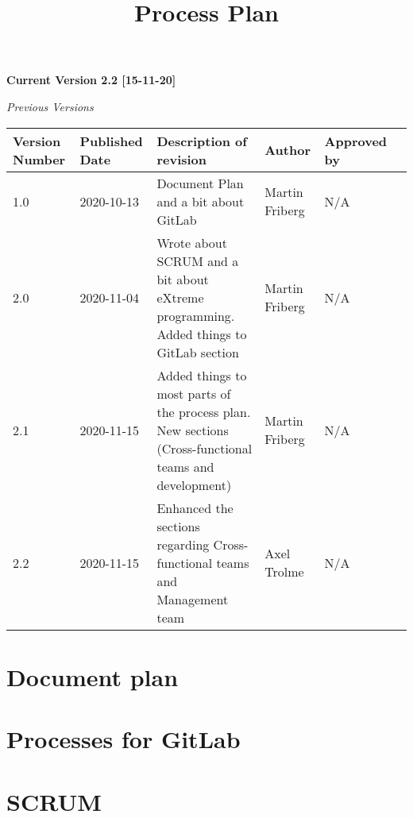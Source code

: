 \documentclass[12pt]{article}
\title{\Huge Process Plan}
\author{}
\begin{document}
\maketitle

\begin{center}
    \textbf{\large Current Version 2.2 [15-11-20]}
    \vspace{10mm}
    
    \emph{\large Previous Versions}
    
\begin{center}
\tiny
\begin{tabular}{ | m{5em} | m{5em}| m{10em} |m{5em}| m{5em} |m{5em} |  } 
\hline
Version Number& Published Date & Description of revision & Author & Approved by \\ 
\hline
1.0 & 2020-10-13 & Document Plan and a bit about GitLab & Martin Friberg & N/A \\
\hline
2.0 & 2020-11-04 & Wrote about SCRUM and a bit about eXtreme programming. Added things to GitLab section & Martin Friberg & N/A \\ 
\hline
2.1 & 2020-11-15 & Added things to most parts of the process plan. New sections (Cross-functional teams and development) & Martin Friberg & N/A \\
\hline
2.2 & 2020-11-15 & Enhanced the sections regarding Cross-functional teams and Management team & Axel Trolme & N/A \\
\hline

\end{tabular}
\end{center}

\end{center}


\clearpage

    \section{Document plan}
    

    \clearpage
    \section{Processes for GitLab}
    

    \pagebreak
    \section{SCRUM}
    
    
\end{document}
